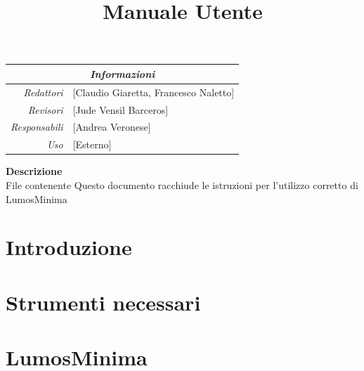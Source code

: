 \documentclass[9pt]{article}
\begin{document}
\graphicspath{ {../templates/img/} {./img}}
\setcounter{tocdepth}{4}
\setcounter{secnumdepth}{4}
\title{Manuale Utente}

\firstPage
\maketitle

\begin{center}
	\begin{tabular}{r | l}
		\multicolumn{2}{c}{\textit{Informazioni}}                         \\
		\hline

		\textit{Redattori}    &
		[Claudio Giaretta, Francesco Naletto]\makecell{} \\

		\textit{Revisori}     &
		[Jude Vensil Barceros]\makecell{}                                 \\
		\textit{Responsabili} &
		[Andrea Veronese]\makecell{}                                      \\
		\textit{Uso}          &
		[Esterno]\makecell{}                                              \\
	\end{tabular}
\end{center}

\begin{center}
	\textbf{Descrizione}\\
	File contenente Questo documento racchiude le istruzioni per l’utilizzo corretto di LumosMinima
\end{center}

\pagebreak

\printindex
\pagebreak

\tableofcontents
\pagebreak


\makeversioni

\section{Introduzione}
\section{Strumenti necessari}
\section{LumosMinima}
\end{document}
